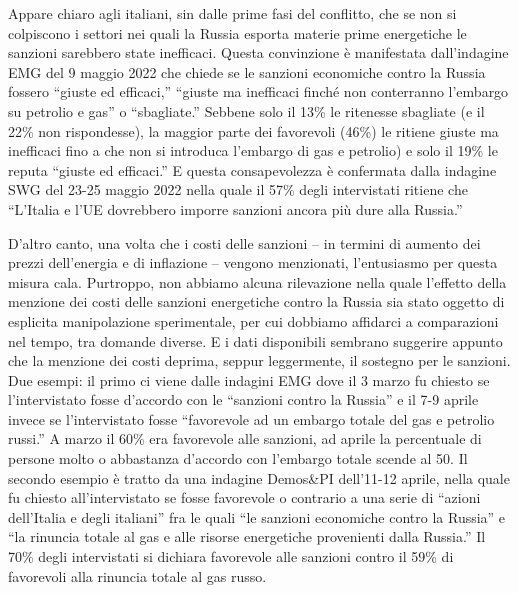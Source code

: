 \documentclass[
]{book}
\begin{document}
Appare chiaro agli italiani, sin dalle prime fasi del conflitto, che se non si colpiscono i settori nei quali la Russia esporta materie prime energetiche le sanzioni sarebbero state inefficaci. Questa convinzione è manifestata dall'indagine EMG del 9 maggio 2022 che chiede se le sanzioni economiche contro la Russia fossero ``giuste ed efficaci,'' ``giuste ma inefficaci finché non conterranno l'embargo su petrolio e gas'' o ``sbagliate.'' Sebbene solo il 13\% le ritenesse sbagliate (e il 22\% non rispondesse), la maggior parte dei favorevoli (46\%) le ritiene giuste ma inefficaci fino a che non si introduca l'embargo di gas e petrolio) e solo il 19\% le reputa ``giuste ed efficaci.'' E questa consapevolezza è confermata dalla indagine SWG del 23-25 maggio 2022 nella quale il 57\% degli intervistati ritiene che ``L'Italia e l'UE dovrebbero imporre sanzioni ancora più dure alla Russia.''

D'altro canto, una volta che i costi delle sanzioni -- in termini di aumento dei prezzi dell'energia e di inflazione -- vengono menzionati, l'entusiasmo per questa misura cala. Purtroppo, non abbiamo alcuna rilevazione nella quale l'effetto della menzione dei costi delle sanzioni energetiche contro la Russia sia stato oggetto di esplicita manipolazione sperimentale, per cui dobbiamo affidarci a comparazioni nel tempo, tra domande diverse. E i dati disponibili sembrano suggerire appunto che la menzione dei costi deprima, seppur leggermente, il sostegno per le sanzioni. Due esempi: il primo ci viene dalle indagini EMG dove il 3 marzo fu chiesto se l'intervistato fosse d'accordo con le ``sanzioni contro la Russia'' e il 7-9 aprile invece se l'intervistato fosse ``favorevole ad un embargo totale del gas e petrolio russi.'' A marzo il 60\% era favorevole alle sanzioni, ad aprile la percentuale di persone molto o abbastanza d'accordo con l'embargo totale scende al 50. Il secondo esempio è tratto da una indagine Demos\&PI dell'11-12 aprile, nella quale fu chiesto all'intervistato se fosse favorevole o contrario a una serie di ``azioni dell'Italia e degli italiani'' fra le quali ``le sanzioni economiche contro la Russia'' e ``la rinuncia totale al gas e alle risorse energetiche provenienti dalla Russia.'' Il 70\% degli intervistati si dichiara favorevole alle sanzioni contro il 59\% di favorevoli alla rinuncia totale al gas russo.
\end{document}
